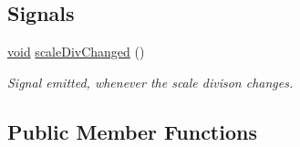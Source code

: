\subsection*{Signals}
\begin{DoxyCompactItemize}
\item 
\hyperlink{group___u_a_v_objects_plugin_ga444cf2ff3f0ecbe028adce838d373f5c}{void} \hyperlink{class_qwt_scale_widget_a55c52717ede368069f5f44b9901e3400}{scale\-Div\-Changed} ()
\begin{DoxyCompactList}\small\item\em Signal emitted, whenever the scale divison changes. \end{DoxyCompactList}\end{DoxyCompactItemize}
\subsection*{Public Member Functions}
